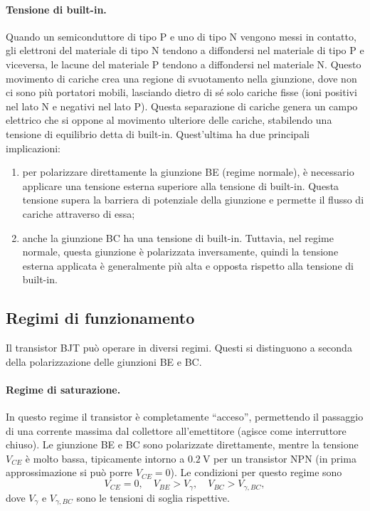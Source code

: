 \paragraph{Tensione di built-in.} Quando un semiconduttore di tipo P e uno di tipo N vengono messi in contatto, gli elettroni del materiale di tipo N tendono a diffondersi nel materiale di tipo P e viceversa, le lacune del materiale P tendono a diffondersi nel materiale N. Questo movimento di cariche crea una regione di svuotamento nella giunzione, dove non ci sono più portatori mobili, lasciando dietro di sé solo cariche fisse (ioni positivi nel lato N e negativi nel lato P). Questa separazione di cariche genera un campo elettrico che si oppone al movimento ulteriore delle cariche, stabilendo una tensione di equilibrio detta di built-in. Quest'ultima ha due principali implicazioni:
\begin{enumerate}
    \item per polarizzare direttamente la giunzione BE (regime normale), è necessario applicare una tensione esterna superiore alla tensione di built-in. Questa tensione supera la barriera di potenziale della giunzione e permette il flusso di cariche attraverso di essa;
    \item anche la giunzione BC ha una tensione di built-in. Tuttavia, nel regime normale, questa giunzione è polarizzata inversamente, quindi la tensione esterna applicata è generalmente più alta e opposta rispetto alla tensione di built-in.
\end{enumerate}

\subsection{Regimi di funzionamento} 
Il transistor BJT può operare in diversi regimi. Questi si distinguono a seconda della polarizzazione delle giunzioni BE e BC.

\paragraph{Regime di saturazione.} In questo regime il transistor è completamente ``acceso'', permettendo il passaggio di una corrente massima dal collettore all'emettitore (agisce come interruttore chiuso). Le giunzione BE e BC sono polarizzate direttamente, mentre la tensione $V_{CE}$ è molto bassa, tipicamente intorno a $\SI{0.2}{\V}$ per un transistor NPN (in prima approssimazione si può porre $V_{CE}=0$). Le condizioni per questo regime sono
\begin{equation}
    V_{CE}=0,\quad V_{BE}>V_{\gamma},\quad V_{BC}>V_{\gamma,BC},
\end{equation}
dove $V_\gamma$ e $V_{\gamma,BC}$ sono le tensioni di soglia rispettive.

